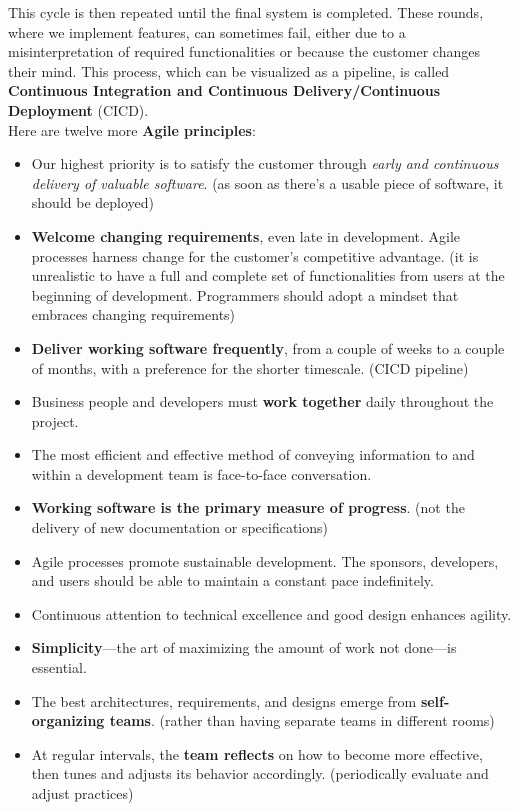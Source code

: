 This cycle is then repeated until the final system is completed. These rounds, where we implement features, can sometimes fail, either due to a misinterpretation of required functionalities or because the customer changes their mind. This process, which can be visualized as a pipeline, is called \textbf{Continuous Integration and Continuous Delivery/Continuous Deployment} (CICD). \\

\noindent Here are twelve more \textbf{Agile principles}:

\begin{itemize}
    \item Our highest priority is to satisfy the customer through \textit{early and continuous delivery of valuable software}. (as soon as there's a usable piece of software, it should be deployed)
    \item \textbf{Welcome changing requirements}, even late in development. Agile processes harness change for the customer's competitive advantage. (it is unrealistic to have a full and complete set of functionalities from users at the beginning of development. Programmers should adopt a mindset that embraces changing requirements)
    \item \textbf{Deliver working software frequently}, from a couple of weeks to a couple of months, with a preference for the shorter timescale. (CICD pipeline)
    \item Business people and developers must \textbf{work together} daily throughout the project.
    \item The most efficient and effective method of conveying information to and within a development team is face-to-face conversation.
    \item \textbf{Working software is the primary measure of progress}. (not the delivery of new documentation or specifications)
    \item Agile processes promote sustainable development. The sponsors, developers, and users should be able to maintain a constant pace indefinitely.
    \item Continuous attention to technical excellence and good design enhances agility.
    \item \textbf{Simplicity}—the art of maximizing the amount of work not done—is essential.
    \item The best architectures, requirements, and designs emerge from \textbf{self-organizing teams}. (rather than having separate teams in different rooms)
    \item At regular intervals, the \textbf{team reflects} on how to become more effective, then tunes and adjusts its behavior accordingly. (periodically evaluate and adjust practices)
\end{itemize}


